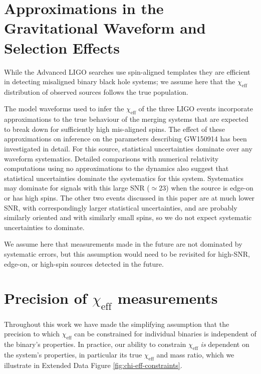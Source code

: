 \documentclass{nature-arxiv}
\newcommand{\chieff}{\chi_\mathrm{eff}}
\begin{document}
\begin{methods}
\section{Approximations in the Gravitational Waveform and Selection Effects}
While the Advanced LIGO searches use spin-aligned templates they are
efficient in detecting misaligned binary black hole
systems\cite{2016PhRvD..93l2003A}; we assume here that the $\chieff$
distribution of observed sources follows the true population.

The model waveforms used to infer the $\chieff$ of the three LIGO
events incorporate approximations to the true behaviour of the merging
systems that are expected to break down for sufficiently high
mis-aligned spins.  The effect of these approximations on inference on
the parameters describing GW150914 has been investigated in
detail\cite{2016arXiv161107531T}.  For this source, statistical
uncertainties dominate over any waveform systematics.  Detailed
comparisons with numerical relativity computations using no
approximations to the dynamics\cite{2016PhRvD..94f4035A} also suggest
that statistical uncertainties dominate the systematics for this
system.  Systematics may dominate for signals with this large SNR
($\simeq 23$) when the source is edge-on or has high
spins\cite{2016arXiv161107531T}.  The other two events discussed in
this paper are at much lower SNR, with correspondingly larger
statistical uncertainties, and are probably similarly oriented and
with similarly small spins, so we do not expect systematic
uncertainties to dominate.

We assume here that measurements made in the future are not dominated
by systematic errors, but this assumption would need to be revisited
for high-SNR, edge-on, or high-spin sources detected in the future.

\section{Precision of $\chieff$ measurements}
\label{sec:chi-eff-precision}
Throughout this work we have made the simplifying assumption that the
precision to which $\chieff$ can be constrained for individual binaries
is independent of the binary's properties.  In practice, our ability to
constrain $\chieff$ \emph{is} dependent on the system's properties, in
particular its true $\chieff$ and mass ratio, which we illustrate in
Extended Data Figure \ref{fig:chi-eff-constraints}.


\end{methods}
\end{document}
